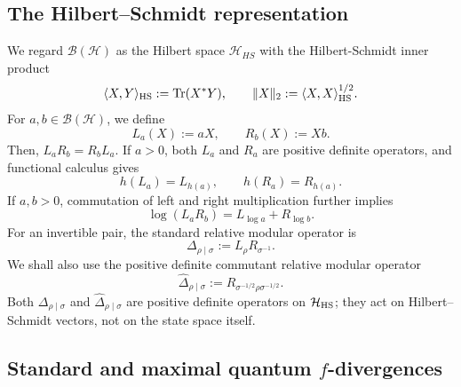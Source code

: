 \documentclass[11pt]{article}
\theoremstyle{remark}
\newcommand{\1}{\mathbbm{1}}
\begin{document}
\subsection{The Hilbert--Schmidt representation}
\label{rw:subsec:hs-representation}

We regard $\mathcal B(\mathcal H)$ as the Hilbert space $\mathcal{H}_{HS}$ with the Hilbert-Schmidt inner product
\begin{equation}
 \langle X,Y\rangle_{\rm HS}:=\operatorname{Tr}(X^*Y),
 \qquad \|X\|_2:=\langle X,X\rangle_{\rm HS}^{1/2}.
 \label{rw:eq:hs-inner-product}
\end{equation}
For $a,b\in\mathcal B(\mathcal H)$, we define
\begin{equation}
 L_a(X):=aX,
 \qquad
 R_b(X):=Xb.
 \label{rw:eq:left-right}
\end{equation}
Then, $L_aR_b=R_bL_a$.  If $a>0$, both $L_a$ and $R_a$ are
positive definite operators, and
functional calculus gives
\begin{equation}
 h(L_a)=L_{h(a)},\qquad h(R_a)=R_{h(a)}.
 \label{rw:eq:left-right-functional-calculus}
\end{equation}
If $a,b>0$, commutation of left and right multiplication further
implies
\begin{equation}
 \log(L_aR_b)=L_{\log a}+R_{\log b}.
 \label{rw:eq:log-left-right}
\end{equation}
For an invertible pair, the standard relative modular operator is
\begin{equation}
 \Delta_{\rho\mid\sigma}:=L_\rho R_{\sigma^{-1}}.
 \label{rw:eq:relative-modular}
\end{equation}
We shall also use the positive definite commutant relative modular
operator
\begin{equation}
 \widehat\Delta_{\rho\mid\sigma}
 :=R_{\sigma^{-1/2}\rho\sigma^{-1/2}}.
 \label{rw:eq:commutant-derivative}
\end{equation}
Both $\Delta_{\rho\mid\sigma}$ and
$\widehat\Delta_{\rho\mid\sigma}$ are positive definite operators on
$\mathcal H_{\rm HS}$; they act on Hilbert--Schmidt vectors, not on
the state space itself.


\subsection{Standard and maximal quantum \texorpdfstring{$f$}{f}-divergences}
\label{rw:subsec:standard-maximal-f-divergences}
\end{document}
